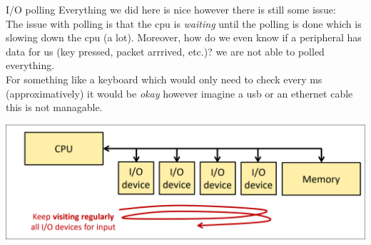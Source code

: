 	

\begin{parag}{I/O polling}
    Everything we did here is nice however there is still some issue: \\ The issue with polling is that the cpu is \textit{waiting} until the polling is done which is slowing down the cpu (a lot). Moreover, how do we even know if a peripheral has data for us (key pressed, packet arrrived, etc.)? we are not able to polled everything. \\
	For something like a keyboard which would only need to check every ms (approximatively) it would be \textit{okay} however imagine a usb or an ethernet cable this is not managable.
	\begin{center}
	\includegraphics[scale=0.2]{screenshots/2025-10-22_11.png}
	\end{center}
\end{parag}


